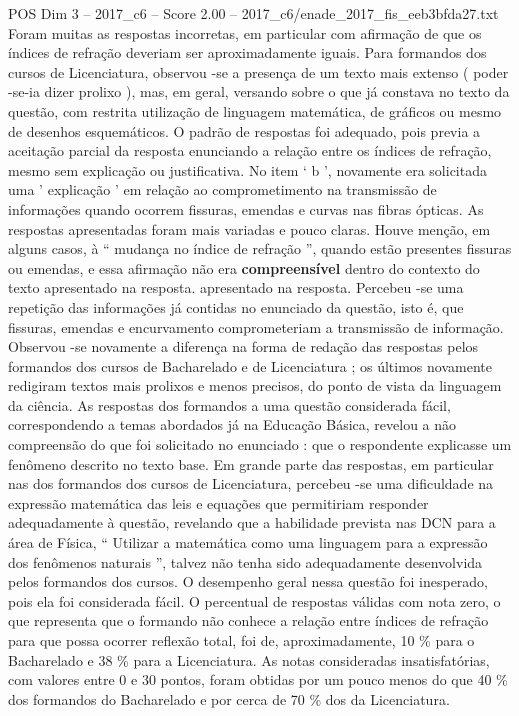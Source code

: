 \begin{textsample}{POS Dim 3 – 2017\_c6 – Score 2.00 – 2017\_c6/enade\_2017\_fis\_eeb3bfda27.txt}
Foram muitas as respostas incorretas, em particular com afirmação de que os índices de refração deveriam ser aproximadamente iguais.
Para formandos dos cursos de Licenciatura, observou -se a presença de um texto mais extenso ( poder -se-ia dizer prolixo ), mas, em geral, versando sobre o que já constava no texto da questão, com restrita utilização de linguagem matemática, de gráficos ou mesmo de desenhos esquemáticos.
O padrão de respostas foi adequado, pois previa a aceitação parcial da resposta enunciando a relação entre os índices de refração, mesmo sem explicação ou justificativa.
No item ‘ b ’, novamente era solicitada uma ' explicação ' em relação ao comprometimento na transmissão de informações quando ocorrem fissuras, emendas e curvas nas fibras ópticas.
As respostas apresentadas foram mais variadas e pouco claras.
Houve menção, em alguns casos, à “ mudança no índice de refração ”, quando estão presentes fissuras ou emendas, e essa afirmação não era \textbf{compreensível} dentro do contexto do texto apresentado na resposta. apresentado na resposta.
Percebeu -se uma repetição das informações já contidas no enunciado da questão, isto é, que fissuras, emendas e encurvamento comprometeriam a transmissão de informação.
Observou -se novamente a diferença na forma de redação das respostas pelos formandos dos cursos de Bacharelado e de Licenciatura ; os últimos novamente redigiram textos mais prolixos e menos precisos, do ponto de vista da linguagem da ciência.
As respostas dos formandos a uma questão considerada fácil, correspondendo a temas abordados já na Educação Básica, revelou a não compreensão do que foi solicitado no enunciado : que o respondente explicasse um fenômeno descrito no texto base.
Em grande parte das respostas, em particular nas dos formandos dos cursos de Licenciatura, percebeu -se uma dificuldade na expressão matemática das leis e equações que permitiriam responder adequadamente à questão, revelando que a habilidade prevista nas DCN para a área de Física, “ Utilizar a matemática como uma linguagem para a expressão dos fenômenos naturais ”, talvez não tenha sido adequadamente desenvolvida pelos formandos dos cursos.
O desempenho geral nessa questão foi inesperado, pois ela foi considerada fácil.
O percentual de respostas válidas com nota zero, o que representa que o formando não conhece a relação entre índices de refração para que possa ocorrer reflexão total, foi de, aproximadamente, 10 \% para o Bacharelado e 38 \% para a Licenciatura.
As notas consideradas insatisfatórias, com valores entre 0 e 30 pontos, foram obtidas por um pouco menos do que 40 \% dos formandos do Bacharelado e por cerca de 70 \% dos da Licenciatura.

\end{textsample}
